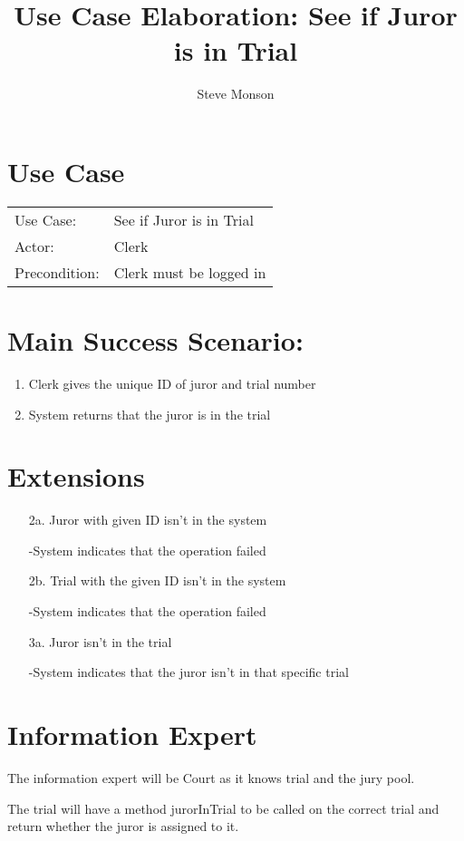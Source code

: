 \documentclass{article}
\title{Use Case Elaboration: See if Juror is in Trial}
\author{Steve Monson}
\begin{document}
\maketitle

\section*{Use Case}
\begin{tabular}{l l}
  Use Case:     & See if Juror is in Trial\\
  Actor:        & Clerk\\
  Precondition: & Clerk must be logged in\\
\end{tabular}

\section*{Main Success Scenario:}
\begin{enumerate}
  \item Clerk gives the unique ID of juror and trial number
  \item System returns that the juror is in the trial
\end{enumerate}

\section*{Extensions}
\begin{itemize}
  \item [2a.] Juror with given ID isn't in the system
  
    -System indicates that the operation failed
  
  \item [2b.] Trial with the given ID isn't in the system

    -System indicates that the operation failed
    
  \item [3a.] Juror isn't in the trial
  
    -System indicates that the juror isn't in that specific trial
    
\end{itemize}

\section*{Information Expert}

The information expert will be Court as it knows trial and the jury pool.

The trial will have a method jurorInTrial to be called on the correct trial and return whether the juror is assigned to it.
\end{document}
